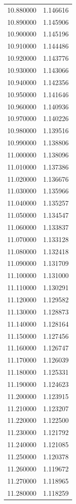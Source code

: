\begin{tabular}{rr}
10.880000 & 1.146616 \\
10.890000 & 1.145906 \\
10.900000 & 1.145196 \\
10.910000 & 1.144486 \\
10.920000 & 1.143776 \\
10.930000 & 1.143066 \\
10.940000 & 1.142356 \\
10.950000 & 1.141646 \\
10.960000 & 1.140936 \\
10.970000 & 1.140226 \\
10.980000 & 1.139516 \\
10.990000 & 1.138806 \\
11.000000 & 1.138096 \\
11.010000 & 1.137386 \\
11.020000 & 1.136676 \\
11.030000 & 1.135966 \\
11.040000 & 1.135257 \\
11.050000 & 1.134547 \\
11.060000 & 1.133837 \\
11.070000 & 1.133128 \\
11.080000 & 1.132418 \\
11.090000 & 1.131709 \\
11.100000 & 1.131000 \\
11.110000 & 1.130291 \\
11.120000 & 1.129582 \\
11.130000 & 1.128873 \\
11.140000 & 1.128164 \\
11.150000 & 1.127456 \\
11.160000 & 1.126747 \\
11.170000 & 1.126039 \\
11.180000 & 1.125331 \\
11.190000 & 1.124623 \\
11.200000 & 1.123915 \\
11.210000 & 1.123207 \\
11.220000 & 1.122500 \\
11.230000 & 1.121792 \\
11.240000 & 1.121085 \\
11.250000 & 1.120378 \\
11.260000 & 1.119672 \\
11.270000 & 1.118965 \\
11.280000 & 1.118259 \\

\end{tabular}
